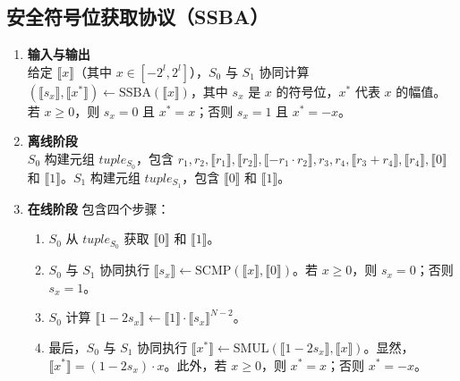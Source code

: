 \subsection{安全符号位获取协议（SSBA）}
\begin{enumerate}[leftmargin=*, nosep]
    \item \textbf{输入与输出}  \\
    给定 $\llbracket x \rrbracket$（其中 $x \in [-2^l, 2^l]$），$S_0$ 与 $S_1$ 协同计算 $(\llbracket s_x \rrbracket, \llbracket x^* \rrbracket) \leftarrow \text{SSBA}(\llbracket x \rrbracket)$，其中 $s_x$ 是 $x$ 的符号位，$x^*$ 代表 $x$ 的幅值。若 $x \geq 0$，则 $s_x = 0$ 且 $x^* = x$；否则 $s_x = 1$ 且 $x^* = -x$。

    \item \textbf{离线阶段}  \\
    $S_0$ 构建元组 $tuple_{S_0}$，包含 $r_1, r_2, \llbracket r_1 \rrbracket, \llbracket r_2 \rrbracket, \llbracket -r_1 \cdot r_2 \rrbracket, r_3, r_4, \llbracket r_3 + r_4 \rrbracket, \llbracket r_4 \rrbracket, \llbracket 0 \rrbracket$ 和 $\llbracket 1 \rrbracket$。$S_1$ 构建元组 $tuple_{S_1}$，包含 $\llbracket 0 \rrbracket$ 和 $\llbracket 1 \rrbracket$。

    \item \textbf{在线阶段}  
    包含四个步骤：
    \begin{enumerate}[leftmargin=*, nosep]
        \item $S_0$ 从 $tuple_{S_0}$ 获取 $\llbracket 0 \rrbracket$ 和 $\llbracket 1 \rrbracket$。
        \item $S_0$ 与 $S_1$ 协同执行 $\llbracket s_x \rrbracket \leftarrow \text{SCMP}(\llbracket x \rrbracket, \llbracket 0 \rrbracket)$。若 $x \geq 0$，则 $s_x = 0$；否则 $s_x = 1$。
        \item $S_0$ 计算 $\llbracket 1 - 2s_x \rrbracket \leftarrow \llbracket 1 \rrbracket \cdot \llbracket s_x \rrbracket^{N-2}$。
        \item 最后，$S_0$ 与 $S_1$ 协同执行 $\llbracket x^* \rrbracket \leftarrow \text{SMUL}(\llbracket 1 - 2s_x \rrbracket, \llbracket x \rrbracket)$。显然，$\llbracket x^* \rrbracket = (1 - 2s_x) \cdot x$。此外，若 $x \geq 0$，则 $x^* = x$；否则 $x^* = -x$。
    \end{enumerate}
\end{enumerate}

